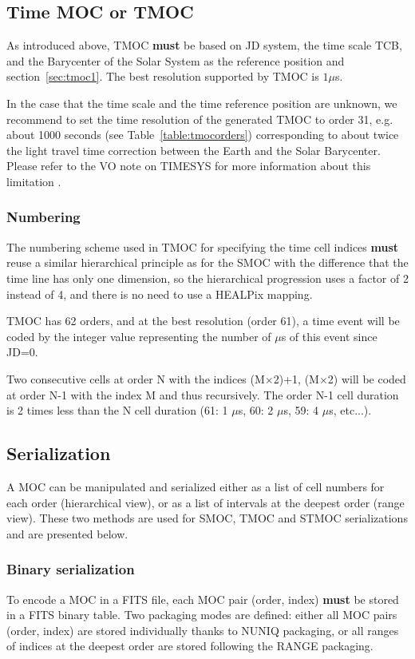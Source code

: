 \documentclass[11pt,a4paper]{ivoa}
\begin{document}
\subsection{Time MOC or TMOC}
As introduced above, TMOC {\bf must} be based on JD system, the time
scale TCB, and the Barycenter of the Solar System as the reference
position \citep[see also][]{2019ASPC..523..497F} and section~\ref{sec:tmoc1}.
The best resolution supported by TMOC is $1 \mu$s.

In the case that the time scale and the time reference position are unknown,
we recommend to set the time resolution of the generated TMOC to order
31, e.g. about 1000 seconds (see Table~\ref{table:tmocorders}) corresponding
to about twice the light travel time correction between the Earth and
the Solar Barycenter. Please refer to the VO note on TIMESYS for more
information about this limitation \citep{timesysnote}.


\subsubsection{Numbering}
The numbering scheme used in TMOC for specifying the time cell indices
{\bf must} reuse a similar hierarchical principle as for the SMOC
with the difference that the time line has only one dimension, so the
hierarchical progression uses a factor of 2 instead of 4, and there is
no need to use a HEALPix mapping.

TMOC has 62 orders, and at the best
resolution (order 61), a time event will be coded by the integer value
representing the number of $\mu$s of this event since JD=0.

Two consecutive cells at order N with the indices
  (M$\times$2)+1, (M$\times$2) will be coded at order N-1 with the index
  M and thus recursively. The order N-1 cell duration is 2 times less
  than the N cell duration (61: 1 $\mu$s, 60: 2 $\mu$s, 59: 4 $\mu$s, etc...).

\subsection{Serialization}
A MOC can be manipulated and serialized either as a list of cell
numbers for each order (hierarchical view), or as a list of intervals
at the deepest order (range view). These two methods are used for
SMOC, TMOC and STMOC serializations and are presented below.

\subsubsection{Binary serialization}
To encode a MOC in a FITS file, each MOC pair (order, index) {\bf
  must} be stored in a FITS binary table. Two packaging modes are
defined: either all MOC pairs (order, index) are stored individually
thanks to NUNIQ packaging, or all ranges of indices at the deepest
order are stored following the RANGE packaging.
\end{document}

